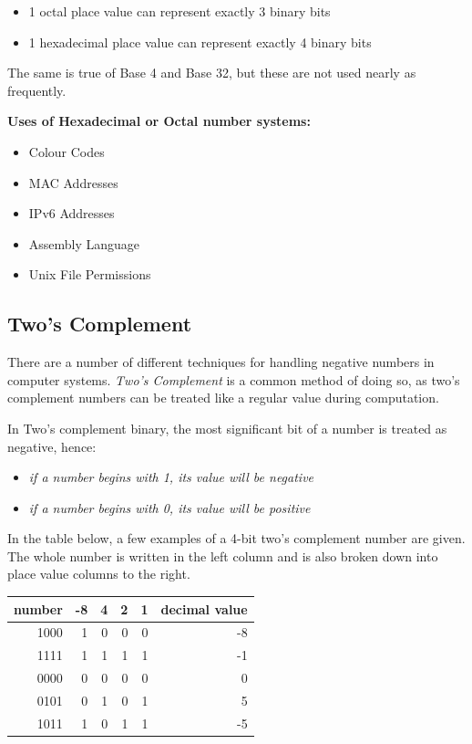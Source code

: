 \documentclass[9pt]{article}
\begin{document}
\begin{itemize}
\item 1 octal place value can represent exactly 3 binary bits
\item 1 hexadecimal place value can represent exactly 4 binary bits
\end{itemize}

The same is true of Base 4 and Base 32, but these are not used nearly as frequently.

\textbf{Uses of Hexadecimal or Octal number systems:}

\begin{itemize}
\item Colour Codes
\item MAC Addresses
\item IPv6 Addresses
\item Assembly Language
\item Unix File Permissions
\end{itemize}

\subsection{Two's Complement}
\label{sec:org98b909e}

There are a number of different techniques for handling negative numbers in computer systems. \emph{Two's Complement} is a common method of doing so, as two's complement numbers can be treated like a regular value during computation.

In Two's complement binary, the most significant bit of a number is treated as negative, hence:

\begin{itemize}
\item \emph{if a number begins with 1, its value will be negative}
\item \emph{if a number begins with 0, its value will be positive}
\end{itemize}

In the table below, a few examples of a 4-bit two's complement number are given. The whole number is written in the left column and is also broken down into place value columns to the right.

\begin{center}
\begin{tabular}{rrrrrr}
\hline
number & -8 & 4 & 2 & 1 & decimal value\\
\hline
1000 & 1 & 0 & 0 & 0 & -8\\
1111 & 1 & 1 & 1 & 1 & -1\\
0000 & 0 & 0 & 0 & 0 & 0\\
0101 & 0 & 1 & 0 & 1 & 5\\
1011 & 1 & 0 & 1 & 1 & -5\\
\hline
\end{tabular}
\end{center}
\end{document}

